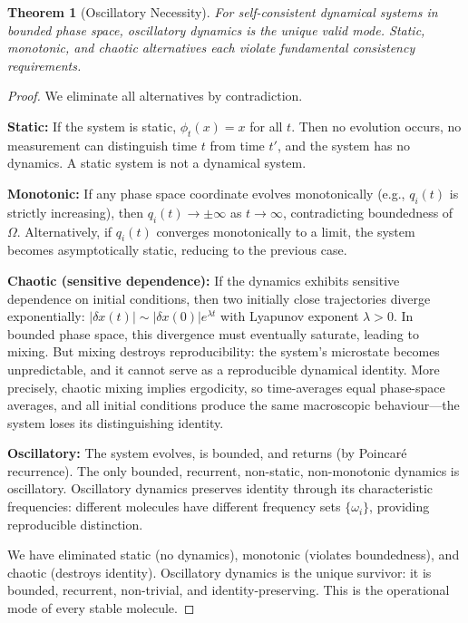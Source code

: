 \documentclass[11pt,twocolumn,a4paper]{article}
\newtheorem{theorem}{Theorem}[section]
\theoremstyle{definition}
\theoremstyle{remark}
\begin{document}
\begin{theorem}[Oscillatory Necessity]
\label{thm:oscillatory}
For self-consistent dynamical systems in bounded phase space, oscillatory dynamics is the unique valid mode. Static, monotonic, and chaotic alternatives each violate fundamental consistency requirements.
\end{theorem}

\begin{proof}
We eliminate all alternatives by contradiction.

\textbf{Static:} If the system is static, $\phi_t(x) = x$ for all $t$. Then no evolution occurs, no measurement can distinguish time $t$ from time $t'$, and the system has no dynamics. A static system is not a dynamical system.

\textbf{Monotonic:} If any phase space coordinate evolves monotonically (e.g., $q_i(t)$ is strictly increasing), then $q_i(t) \to \pm \infty$ as $t \to \infty$, contradicting boundedness of $\Omega$. Alternatively, if $q_i(t)$ converges monotonically to a limit, the system becomes asymptotically static, reducing to the previous case.

\textbf{Chaotic (sensitive dependence):} If the dynamics exhibits sensitive dependence on initial conditions, then two initially close trajectories diverge exponentially: $|\delta x(t)| \sim |\delta x(0)| e^{\lambda t}$ with Lyapunov exponent $\lambda > 0$. In bounded phase space, this divergence must eventually saturate, leading to mixing. But mixing destroys reproducibility: the system's microstate becomes unpredictable, and it cannot serve as a reproducible dynamical identity. More precisely, chaotic mixing implies ergodicity, so time-averages equal phase-space averages, and all initial conditions produce the same macroscopic behaviour---the system loses its distinguishing identity.

\textbf{Oscillatory:} The system evolves, is bounded, and returns (by Poincar\'e recurrence). The only bounded, recurrent, non-static, non-monotonic dynamics is oscillatory. Oscillatory dynamics preserves identity through its characteristic frequencies: different molecules have different frequency sets $\{\omega_i\}$, providing reproducible distinction.

We have eliminated static (no dynamics), monotonic (violates boundedness), and chaotic (destroys identity). Oscillatory dynamics is the unique survivor: it is bounded, recurrent, non-trivial, and identity-preserving. This is the operational mode of every stable molecule.
\end{proof}
\end{document}

